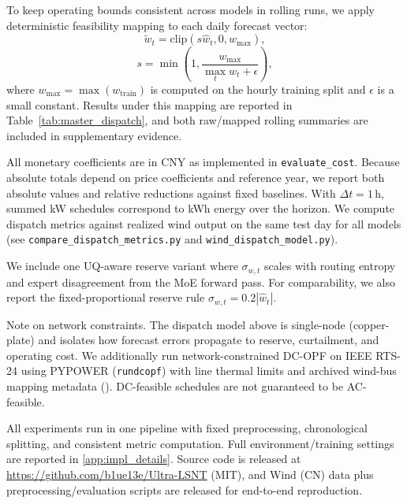 \documentclass[review,1p,times]{elsarticle}
\begin{document}
To keep operating bounds consistent across models in rolling runs, we apply deterministic feasibility mapping to each daily forecast vector:
\begin{equation}
\tilde{w}_t=\mathrm{clip}(s\hat{w}_t,0,w_{\max}),
\label{eq:dispatch_feas_map}
\end{equation}
\begin{equation}
s=\min\left(1,\frac{w_{\max}}{\max_t \hat{w}_t + \epsilon}\right),
\end{equation}
where $w_{\max}=\max(w_{\text{train}})$ is computed on the hourly training split and $\epsilon$ is a small constant. Results under this mapping are reported in Table~\ref{tab:master_dispatch}, and both raw/mapped rolling summaries are included in supplementary evidence.

All monetary coefficients are in CNY as implemented in \texttt{evaluate\_cost}. Because absolute totals depend on price coefficients and reference year, we report both absolute values and relative reductions against fixed baselines. With $\Delta t=1$\,h, summed kW schedules correspond to kWh energy over the horizon. We compute dispatch metrics against realized wind output on the same test day for all models (see \texttt{compare\_dispatch\_metrics.py} and \texttt{wind\_dispatch\_model.py}).

We include one UQ-aware reserve variant where $\sigma_{w,t}$ scales with routing entropy and expert disagreement from the MoE forward pass. For comparability, we also report the fixed-proportional reserve rule $\sigma_{w,t}=0.2|\hat{w}_t|$.



Note on network constraints.
The dispatch model above is single-node (copper-plate) and isolates how forecast errors propagate to reserve, curtailment, and operating cost. We additionally run network-constrained DC-OPF on IEEE RTS-24 using PYPOWER (\texttt{rundcopf}) with line thermal limits and archived wind-bus mapping metadata (). DC-feasible schedules are not guaranteed to be AC-feasible.

All experiments run in one pipeline with fixed preprocessing, chronological splitting, and consistent metric computation. Full environment/training settings are reported in \ref{app:impl_details}. Source code is released at \url{https://github.com/b1ue13e/Ultra-LSNT} (MIT), and Wind (CN) data plus preprocessing/evaluation scripts are released for end-to-end reproduction.
\end{document}
